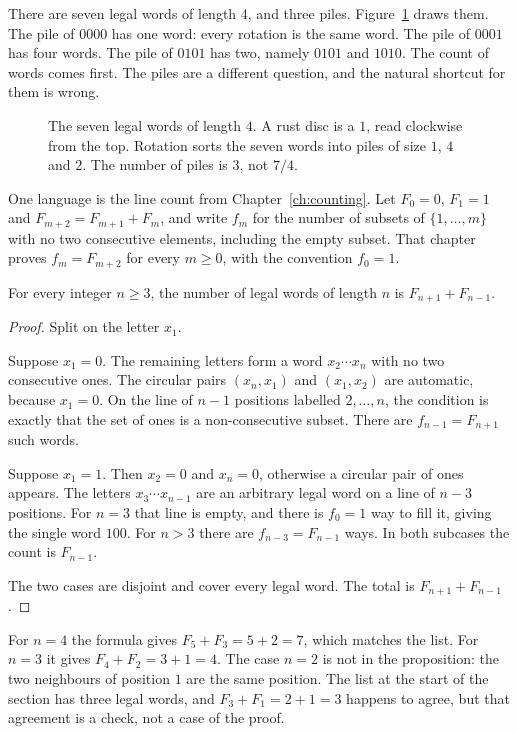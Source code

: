 There are seven legal words of length $4$, and three piles. Figure~\ref{fig:field-circle} draws them. The pile of $0000$ has one word: every rotation is the same word. The pile of $0001$ has four words. The pile of $0101$ has two, namely $0101$ and $1010$. The count of words comes first. The piles are a different question, and the natural shortcut for them is wrong.

\begin{figure}[ht]
\centering
{}
\caption{The seven legal words of length $4$. A rust disc is a $1$, read clockwise from the top. Rotation sorts the seven words into piles of size $1$, $4$ and $2$. The number of piles is $3$, not $7/4$.}
\label{fig:field-circle}
\end{figure}

One language is the line count from Chapter~\ref{ch:counting}. Let $F_0=0$, $F_1=1$ and $F_{m+2}=F_{m+1}+F_m$, and write $f_m$ for the number of subsets of $\{1,\dots,m\}$ with no two consecutive elements, including the empty subset. That chapter proves $f_m=F_{m+2}$ for every $m\ge0$, with the convention $f_0=1$.

\begin{propositionx}
For every integer $n\ge3$, the number of legal words of length $n$ is $F_{n+1}+F_{n-1}$.
\end{propositionx}

\begin{proof}
Split on the letter $x_1$.

Suppose $x_1=0$. The remaining letters form a word $x_2\cdots x_n$ with no two consecutive ones. The circular pairs $(x_n,x_1)$ and $(x_1,x_2)$ are automatic, because $x_1=0$. On the line of $n-1$ positions labelled $2,\dots,n$, the condition is exactly that the set of ones is a non-consecutive subset. There are $f_{n-1}=F_{n+1}$ such words.

Suppose $x_1=1$. Then $x_2=0$ and $x_n=0$, otherwise a circular pair of ones appears. The letters $x_3\cdots x_{n-1}$ are an arbitrary legal word on a line of $n-3$ positions. For $n=3$ that line is empty, and there is $f_0=1$ way to fill it, giving the single word $100$. For $n>3$ there are $f_{n-3}=F_{n-1}$ ways. In both subcases the count is $F_{n-1}$.

The two cases are disjoint and cover every legal word. The total is $F_{n+1}+F_{n-1}$.
\end{proof}

For $n=4$ the formula gives $F_5+F_3=5+2=7$, which matches the list. For $n=3$ it gives $F_4+F_2=3+1=4$. The case $n=2$ is not in the proposition: the two neighbours of position $1$ are the same position. The list at the start of the section has three legal words, and $F_3+F_1=2+1=3$ happens to agree, but that agreement is a check, not a case of the proof.

